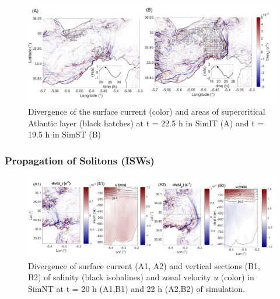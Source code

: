 \begin{figure}[!h]
 \centering
\includegraphics[width=\linewidth]{./GBR3D/FigWaveCont.png}
 \caption [Divergence of the surface current and areas of supercritical Atlantic layer]{Divergence of the surface current (color) and areas of supercritical Atlantic layer (black hatches) at t = 22.5 h in SimIT (A) and t = 19.5 h in SimST (B)}
 \label{FigISWGBR3D}
\end{figure}

\subsubsection{Propagation of Solitons (ISWs)}
\label{section_sim3D_ISW}

\begin{figure}[!h]
 \centering
 \includegraphics[width=1.\textwidth]{./GBR3D/coupesISW_ME2-2.png}
 \caption [Divergence of surface current and vertical sections of salinity and sonal velocity.]{Divergence of surface current (A1, A2) and vertical sections (B1, B2) of salinity (black isohalines) and zonal velocity $u$ (color) in SimNT at t = 20 h (A1,B1) and 22 h (A2,B2) of simulation.}
  \label{FigISWNT}
\end{figure}

